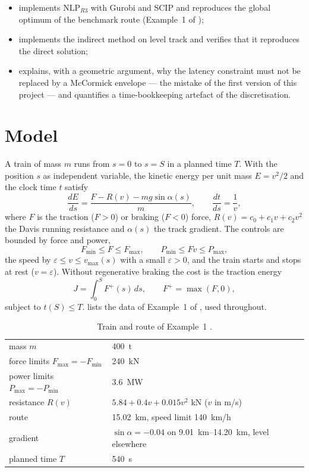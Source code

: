 \documentclass[11pt,a4paper]{article}
\newcommand{\NLP}{\text{NLP}_{R3}}
\begin{document}
\begin{itemize}
  \item implements $\NLP$ with Gurobi and SCIP and reproduces the global optimum of the benchmark route (Example~1 of
        \citealp{Xiao2025});
  \item implements the indirect method on level track and verifies that it reproduces the direct solution;
  \item explains, with a geometric argument, why the latency constraint must not be replaced by a McCormick envelope
        --- the mistake of the first version of this project --- and quantifies a time-bookkeeping artefact of the
        discretisation.
\end{itemize}

\section{Model}\label{sec:model}

A train of mass $m$ runs from $s=0$ to $s=S$ in a planned time $T$. With the position $s$ as independent variable, the
kinetic energy per unit mass $E = v^2/2$ and the clock time $t$ satisfy
\begin{equation}\label{eq:dyn}
  \frac{dE}{ds} = \frac{F - R(v) - m g \sin\alpha(s)}{m}, \qquad \frac{dt}{ds} = \frac{1}{v},
\end{equation}
where $F$ is the traction ($F>0$) or braking ($F<0$) force, $R(v) = c_0 + c_1 v + c_2 v^2$ the Davis running
resistance and $\alpha(s)$ the track gradient. The controls are bounded by force and power,
\begin{equation}\label{eq:bounds}
  F_{\min} \le F \le F_{\max}, \qquad P_{\min} \le F v \le P_{\max},
\end{equation}
the speed by $\varepsilon \le v \le v_{\max}(s)$ with a small $\varepsilon > 0$, and the train starts and stops at rest
($v = \varepsilon$). Without regenerative braking the cost is the traction energy
\begin{equation}\label{eq:cost}
  J = \int_0^S F^+(s)\, ds, \qquad F^+ = \max(F, 0),
\end{equation}
subject to $t(S) \le T$.  lists the data of Example~1 of \citet{Xiao2025}, used throughout.

\begin{table}[h]
\centering
\caption{Train and route of Example~1 \citep{Xiao2025}.}\label{tab:train}
\begin{tabular}{ll}
\toprule
mass $m$ & \SI{400}{t} \\
force limits $F_{\max} = -F_{\min}$ & \SI{240}{kN} \\
power limits $P_{\max} = -P_{\min}$ & \SI{3.6}{MW} \\
resistance $R(v)$ & $5.84 + 0.4 v + 0.015 v^2$ \si{kN} ($v$ in \si{m/s}) \\
route & \SI{15.02}{km}, speed limit \SI{140}{km/h} \\
gradient & $\sin\alpha = -0.04$ on \SIrange{9.01}{14.20}{km}, level elsewhere \\
planned time $T$ & \SI{540}{s} \\
\bottomrule
\end{tabular}
\end{table}
\end{document}
